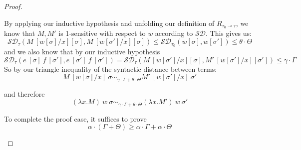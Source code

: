 \begin{proof}
\begin{description}
      By applying our inductive hypothesis and unfolding our definition of
      $R_{\tau_0 \multimap \tau}$, we know that $M, M'$ is 
      1-sensitive with respect to $w$ according to $\mathcal{SD}$. 
      This gives us:
      $$
      \mathcal{SD}_{\tau}(M~[w[\sigma]/x][\sigma], M~[w[\sigma']/x][\sigma]) 
      \leq 
      \mathcal{SD}_{\tau_0}(w[\sigma], w[\sigma']) 
      \leq 
      \theta \cdot \Theta
      $$
      and we also know that by our inductive hypothesis
      $$
      \mathcal{SD}_{\tau}(e~[\sigma]~f~[\sigma'], e~[\sigma']~f~[\sigma']) 
      =
      \mathcal{SD}_{\tau}(M~[w[\sigma']/x][\sigma], M'~[w[\sigma']/x][\sigma']) 
      \leq 
      \gamma \cdot \Gamma
      $$
      So by our triangle inequality of the syntactic distance between terms:
      $$
      M~[w[\sigma]/x]~\sigma \sim_{\gamma \cdot \Gamma + \theta \cdot \Theta}
      M'~[w[\sigma']/x]~\sigma'
      $$

      and therefore
      $$
      (\lambda x . M)~w~\sigma \sim_{\gamma \cdot \Gamma + \theta \cdot \Theta} (\lambda x . M')~w~\sigma'
      $$

      To complete the proof case, it suffices to prove 
      $$\alpha \cdot (\Gamma + \Theta) \geq \alpha \cdot \Gamma + \alpha \cdot \Theta$$


\end{description}
\end{proof}
